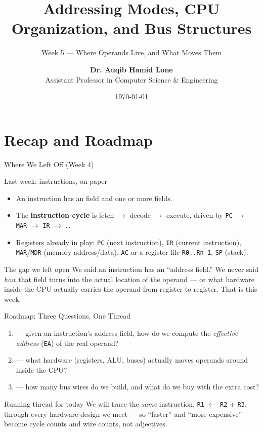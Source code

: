 \documentclass[aspectratio=169]{beamer}
\title{Addressing Modes, CPU Organization, and Bus Structures}
\subtitle{Week 5 --- Where Operands Live, and What Moves Them}
\author[Dr. Auqib Hamid Lone]{%
  \textbf{Dr. Auqib Hamid Lone}\\
  \small Assistant Professor in Computer Science \& Engineering
}
\institute[GCET Ganderbal]{%
  \small\textbf{PCC CS-401: Computer Organization and Architecture}\\[0.3em]
  Department of Computer Science \& Engineering\\
  Government College of Engineering \& Technology (GCET), Ganderbal
}
\date[\today]{\small\today}
\begin{document}
\frame{\titlepage}

\section{Recap and Roadmap}

\begin{frame}{Where We Left Off (Week 4)}
  \begin{block}{Last week: instructions, on paper}
    \begin{itemize}
      \item An instruction has an  field and one or more  fields.
      \item The \textbf{instruction cycle} is fetch $\to$ decode $\to$ execute, driven by
        \texttt{PC} $\to$ \texttt{MAR} $\to$ \texttt{IR} $\to$ \dots
      \item Registers already in play: \texttt{PC} (next instruction), \texttt{IR}
        (current instruction), \texttt{MAR}/\texttt{MDR} (memory address/data),
        \texttt{AC} or a register file \texttt{R0..Rn-1}, \texttt{SP} (stack).
    \end{itemize}
  \end{block}
  \vspace{0.3cm}
  \begin{exampleblock}{The gap we left open}
    We said an instruction has an ``address field.'' We never said \emph{how} that
    field turns into the actual location of the operand --- or what hardware inside
    the CPU actually carries the operand from register to register. That is this week.
  \end{exampleblock}
\end{frame}

\begin{frame}{Roadmap: Three Questions, One Thread}
  \begin{enumerate}
    \item {} --- given an instruction's address field, how do we
      compute the \emph{effective address} (\texttt{EA}) of the real operand?
    \item {} --- what hardware (registers, ALU, buses) actually
      moves operands around inside the CPU?
    \item {} --- how many bus wires do we build,
      and what do we buy with the extra cost?
    \end{enumerate}
  \vspace{0.4cm}
  \begin{alertblock}{Running thread for today}
    We will trace the \emph{same} instruction, \texttt{R1} $\gets$ \texttt{R2} + \texttt{R3},
    through every hardware design we meet --- so ``faster'' and ``more expensive''
    become cycle counts and wire counts, not adjectives.
  \end{alertblock}
\end{frame}
\end{document}
